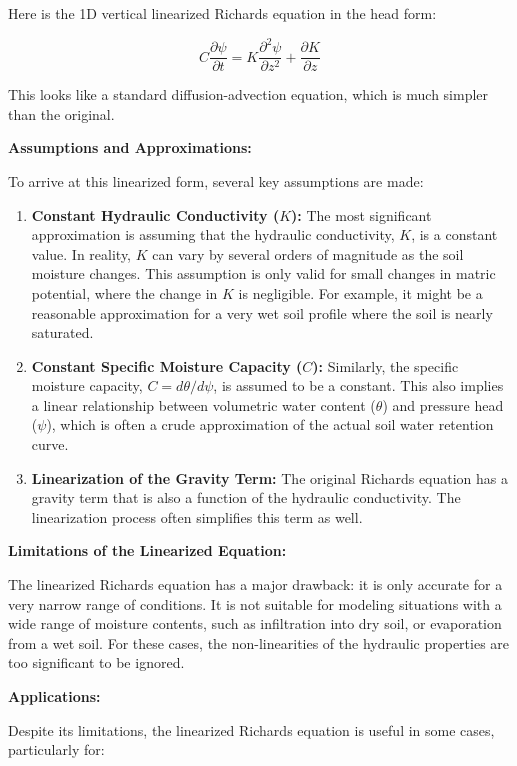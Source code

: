 \documentclass[
]{article}
\begin{document}
Here is the 1D vertical linearized Richards equation in the head form:

\[C \frac{\partial \psi}{\partial t} = K \frac{\partial^2 \psi}{\partial z^2} + \frac{\partial K}{\partial z}\]

This looks like a standard diffusion-advection equation, which is much
simpler than the original.

\textbf{Assumptions and Approximations:}

To arrive at this linearized form, several key assumptions are made:

\begin{enumerate}
\def\labelenumi{\arabic{enumi}.}
\item
  \textbf{Constant Hydraulic Conductivity (\(K\)):} The most significant
  approximation is assuming that the hydraulic conductivity, \(K\), is a
  constant value. In reality, \(K\) can vary by several orders of
  magnitude as the soil moisture changes. This assumption is only valid
  for small changes in matric potential, where the change in \(K\) is
  negligible. For example, it might be a reasonable approximation for a
  very wet soil profile where the soil is nearly saturated.
\item
  \textbf{Constant Specific Moisture Capacity (\(C\)):} Similarly, the
  specific moisture capacity, \(C = d\theta/d\psi\), is assumed to be a
  constant. This also implies a linear relationship between volumetric
  water content (\(\theta\)) and pressure head (\(\psi\)), which is
  often a crude approximation of the actual soil water retention curve.
\item
  \textbf{Linearization of the Gravity Term:} The original Richards
  equation has a gravity term that is also a function of the hydraulic
  conductivity. The linearization process often simplifies this term as
  well.
\end{enumerate}

\textbf{Limitations of the Linearized Equation:}

The linearized Richards equation has a major drawback: it is only
accurate for a very narrow range of conditions. It is not suitable for
modeling situations with a wide range of moisture contents, such as
infiltration into dry soil, or evaporation from a wet soil. For these
cases, the non-linearities of the hydraulic properties are too
significant to be ignored.

\textbf{Applications:}

Despite its limitations, the linearized Richards equation is useful in
some cases, particularly for:
\end{document}
